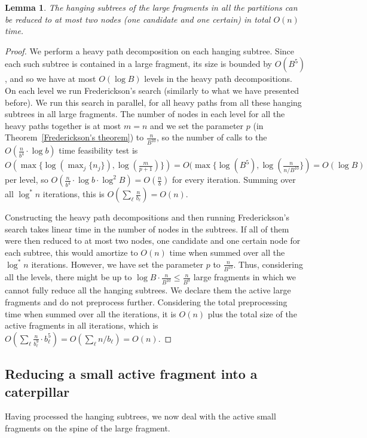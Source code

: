 \documentclass[11pt,a4paper]{article}
\newtheorem{lemma}{Lemma}
\theoremstyle{definition}
\theoremstyle{remark}
\begin{document}
\begin{lemma}\label{lemma1}
The hanging subtrees of the large fragments in all the partitions can be reduced to at most two nodes (one candidate and one certain) in total $O(n)$ time. 
\end{lemma}
\begin{proof}
We perform a heavy path decomposition on each hanging subtree. Since each such subtree is contained in a large fragment, its 
size is bounded by $O(B^5)$, and so we have at most $O(\log B)$ levels in the heavy 
path decompositions. On each level we run Frederickson's search (similarly to what we have presented before).
We run this search in parallel, for all heavy paths from all these hanging subtrees in all large fragments.
The number of  nodes in each level for all the heavy paths together is at most $m=n$ and we set
the parameter $p$ (in Theorem~\ref{Frederickson's theorem}) to $\frac{n}{B^{10}}$, so the number of calls to the $O(\frac{n}{b^4} \cdot \log b)$ time feasibility test
is $O(\max \lbrace \log(\max_{j} \lbrace n_j \rbrace), \log(\frac{m}{p+1}) \rbrace) = O(\max \lbrace \log (B^{5}), \log(\frac{n}{n/B^{10}} \rbrace) = O(\log B)$ per level, so
$O(\frac{n}{b^4} \cdot \log b \cdot \log^{2} B) = O(\frac{n}{b})$ for every iteration.
Summing over all $\log^{*}n$ iterations, this is $O(\sum_{\ell}\frac{n}{b_\ell}) = O(n)$.

Constructing the heavy path decompositions and then running Frederickson's search takes linear time in the number
of nodes in the subtrees. If all of them were then reduced to at most two nodes, one candidate and one certain
node for each subtree, this would amortize to $O(n)$ time when summed over all the $\log^{*}n$  iterations. However, we have set
the parameter $p$ to $\frac{n}{B^{10}}$. Thus, considering all the levels, there
might be up to $\log B\cdot\frac{n}{B^{10}}\leq \frac{n}{B^{9}}$ large fragments in which we cannot fully reduce
all the hanging subtrees. We declare them the active large fragments and do not preprocess further.
Considering the total preprocessing time when summed over all the iterations, it is $O(n)$
plus the total size of the active fragments in all iterations, which is $O(\sum_{\ell} \frac{n}{b_{\ell}^{9}}\cdot b_{\ell}^{5})=O(\sum_{\ell} n/b_{\ell})=O(n)$.
\end{proof}

\subsection{Reducing a small active fragment into a caterpillar}\label{section:lemma2}
Having processed the hanging subtrees, we now deal with the active small fragments on the spine of the large fragment. 
\end{document}
